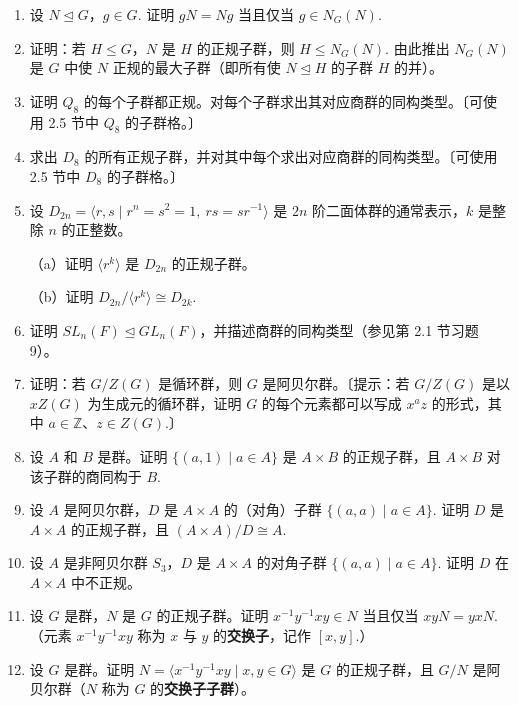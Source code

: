 \begin{enumerate}
\item 设 \(N \trianglelefteq G\)，\(g \in G\). 证明 \(gN = Ng\) 当且仅当 \(g \in N_G(N)\).

\item 证明：若 \(H \leq G\)，\(N\) 是 \(H\) 的正规子群，则 \(H \leq N_G(N)\). 由此推出 \(N_G(N)\) 是 \(G\) 中使 \(N\) 正规的最大子群（即所有使 \(N \trianglelefteq H\) 的子群 \(H\) 的并）。

\item 证明 \(Q_8\) 的每个子群都正规。对每个子群求出其对应商群的同构类型。〔可使用 2.5 节中 \(Q_8\) 的子群格。〕

\item 求出 \(D_8\) 的所有正规子群，并对其中每个求出对应商群的同构类型。〔可使用 2.5 节中 \(D_8\) 的子群格。〕

\item 设 \(D_{2n} = \langle r, s \mid r^n = s^2 = 1,\ rs = sr^{-1} \rangle\) 是 \(2n\) 阶二面体群的通常表示，\(k\) 是整除 \(n\) 的正整数。

（a）证明 \(\langle r^k \rangle\) 是 \(D_{2n}\) 的正规子群。

（b）证明 \(D_{2n}/\langle r^k \rangle \cong D_{2k}\).

\item 证明 \(SL_n(F) \trianglelefteq GL_n(F)\)，并描述商群的同构类型（参见第 2.1 节习题 9）。

\item 证明：若 \(G/Z(G)\) 是循环群，则 \(G\) 是阿贝尔群。〔提示：若 \(G/Z(G)\) 是以 \(xZ(G)\) 为生成元的循环群，证明 \(G\) 的每个元素都可以写成 \(x^a z\) 的形式，其中 \(a \in \mathbb{Z}\)、\(z \in Z(G)\).〕

\item 设 \(A\) 和 \(B\) 是群。证明 \(\{(a, 1) \mid a \in A\}\) 是 \(A \times B\) 的正规子群，且 \(A \times B\) 对该子群的商同构于 \(B\).

\item 设 \(A\) 是阿贝尔群，\(D\) 是 \(A \times A\) 的（对角）子群 \(\{(a, a) \mid a \in A\}\). 证明 \(D\) 是 \(A \times A\) 的正规子群，且 \((A \times A)/D \cong A\).

\item 设 \(A\) 是非阿贝尔群 \(S_3\)，\(D\) 是 \(A \times A\) 的对角子群 \(\{(a, a) \mid a \in A\}\). 证明 \(D\) 在 \(A \times A\) 中不正规。

\item 设 \(G\) 是群，\(N\) 是 \(G\) 的正规子群。证明 \(x^{-1}y^{-1}xy \in N\) 当且仅当 \(xyN = yxN\).（元素 \(x^{-1}y^{-1}xy\) 称为 \(x\) 与 \(y\) 的\textbf{交换子}，记作 \([x, y]\).）

\item 设 \(G\) 是群。证明 \(N = \langle x^{-1}y^{-1}xy \mid x, y \in G \rangle\) 是 \(G\) 的正规子群，且 \(G/N\) 是阿贝尔群（\(N\) 称为 \(G\) 的\textbf{交换子子群}）。
\end{enumerate}

